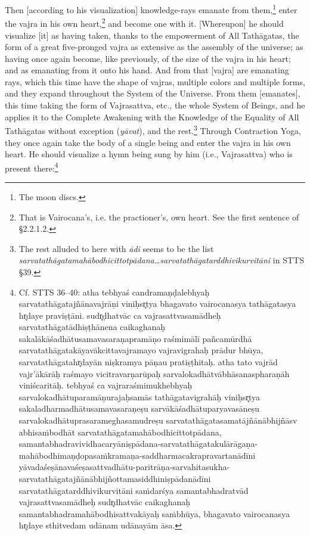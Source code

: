 \documentclass[11pt]{book}
\newcommand{\skt}[1]{\emph{#1}}
\begin{document}
Then [according to his visualization] knowledge-rays emanate from them,\footnote{The moon discs.} enter the vajra in his own heart,\footnote{That is Vairocana's, i.e. the practioner's, own heart. See the first sentence of §2.2.1.2.} and become one with it. [Whereupon] he should visualize [it] as having taken, thanks to the empowerment of All Tathāgatas, the form of a great five-pronged vajra as extensive as the assembly of the universe; as having once again become, like previously, of the size of the vajra in his heart; and as emanating from it onto his hand. And from that [vajra] are emanating rays, which this time have the shape of vajras, multiple colors and multiple forms, and they expand throughout the System of the Universe. From them [emanates], this time taking the form of Vajrasattva, etc., the whole System of Beings, and he applies it to the Complete Awakening with the Knowledge of the Equality of All Tathāgatas without exception (\skt{yāvat}), and the rest.\footnote{The rest alluded to here with \skt{ādi} seems to be the list \skt{sarvatathāgatamahābodhicittotpādana{\ldots}sarvatathāgatarddhivikurvitāni} in STTS §39.} Through Contraction Yoga, they once again take the body of a single being and enter the vajra in his own heart. He should visualize a hymn being sung by him (i.e., Vajrasattva) who is present there:\footnote{Cf. STTS 36–40: atha tebhyaś candramaṇḍalebhyaḥ sarvatathāgatajñānavajrāṇi viniḥsr̥tya bhagavato vairocanasya tathāgatasya hr̥daye praviṣṭāni. sudr̥ḍhatvāc ca vajrasattvasamādheḥ sarvatathāgatādhiṣṭhānena caikaghanaḥ sakalākāśadhātusamavasaraṇapramāṇo raśmimālī pañcamūrdhā sarvatathāgatakāyavākcittavajramayo vajravigrahaḥ prādur bhūya, sarvatathāgatahr̥dayān niṣkramya pāṇau pratiṣṭhitaḥ. atha tato vajrād vajr'ākārāḥ raśmayo vicitravarṇarūpaḥ sarvalokadhātvābhāsanaspharaṇāh viniścaritāḥ. tebhyaś ca vajraraśmimukhebhyaḥ sarvalokadhātuparamāṇurajaḥsamās tathāgatavigrahāḥ viniḥsr̥tya sakaladharmadhātusamavasaraṇeṣu sarvākāśadhātuparyavasāneṣu sarvalokadhātuprasarameghasamudreṣu sarvatathāgatasamatājñānābhijñāsv abhisaṁbodhāt sarvatathāgatamahābodhicittotpādana, samantabhadravividhacaryāniṣpādana-sarvatathāgatakulārāgaṇa-mahābodhimaṇḍopasaṁkramaṇa-saddharmacakrapravartanādīni yāvadaśeṣānavaśeṣasattvadhātu-paritrāṇa-sarvahitasukha-sarvatathāgatajñānābhijñottamasiddhiniṣpādanādīni sarvatathāgatarddhivikurvitāni saṁdarśya samantabhadratvād vajrasattvasamādheḥ sudr̥dhatvāc caikaghanaḥ samantabhadramahābodhisattvakāyaḥ saṁbhūya, bhagavato vairocanasya hr̥daye sthitvedam udānam udānayām āsa.}
\end{document}
